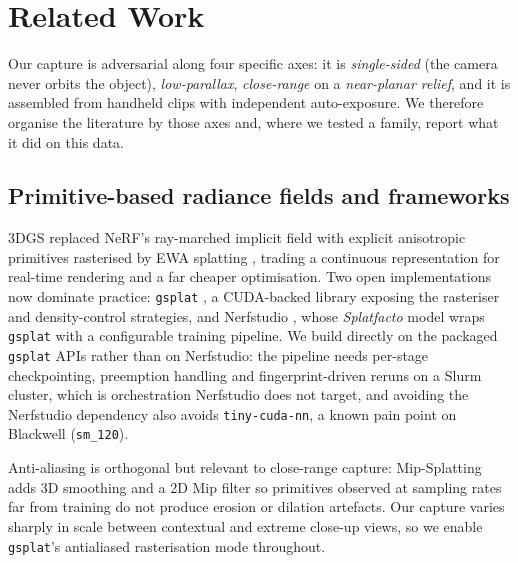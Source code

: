 %

\section{Related Work}
\label{sec:related}

Our capture is adversarial along four specific axes: it is \emph{single-sided}
(the camera never orbits the object), \emph{low-parallax}, \emph{close-range} on a
\emph{near-planar relief}, and it is assembled from handheld clips with
independent auto-exposure. We therefore organise the literature by those axes and,
where we tested a family, report what it did on this data.

\subsection{Primitive-based radiance fields and frameworks}

3DGS \cite{kerbl2023gaussian} replaced NeRF's ray-marched implicit field
\cite{mildenhall2020nerf} with explicit anisotropic primitives rasterised by EWA
splatting \cite{zwicker2001ewa,zwicker2001surface}, trading a continuous
representation for real-time rendering and a far cheaper optimisation. Two open
implementations now dominate practice: \texttt{gsplat} \cite{ye2024gsplat}, a
CUDA-backed library exposing the rasteriser and density-control strategies, and
Nerfstudio \cite{tancik2023nerfstudio}, whose \emph{Splatfacto} model wraps
\texttt{gsplat} with a configurable training pipeline. We build directly on the
packaged \texttt{gsplat} APIs rather than on Nerfstudio: the pipeline needs
per-stage checkpointing, preemption handling and fingerprint-driven reruns on a
Slurm cluster, which is orchestration Nerfstudio does not target, and avoiding the
Nerfstudio dependency also avoids \texttt{tiny-cuda-nn}, a known pain point on
Blackwell (\texttt{sm\_120}).

Anti-aliasing is orthogonal but relevant to close-range capture: Mip-Splatting
\cite{yu2024mipsplatting} adds 3D smoothing and a 2D Mip filter so primitives
observed at sampling rates far from training do not produce erosion or dilation
artefacts. Our capture varies sharply in scale between contextual and extreme
close-up views, so we enable \texttt{gsplat}'s antialiased rasterisation mode
throughout.

